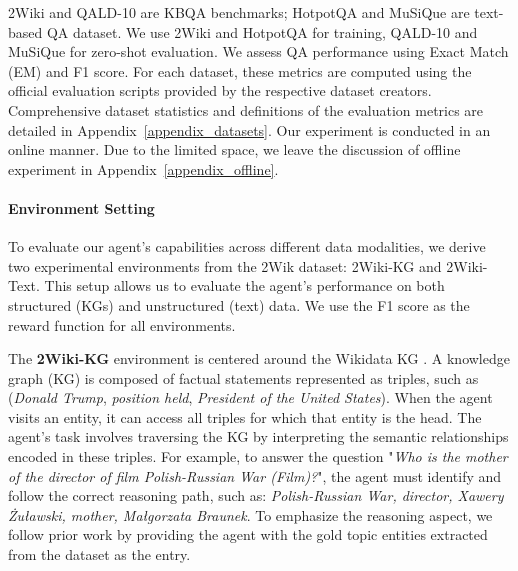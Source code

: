 2Wiki and QALD-10 are KBQA benchmarks; HotpotQA and MuSiQue are text-based QA dataset.
We use 2Wiki and HotpotQA for training, QALD-10 and MuSiQue for zero-shot evaluation.
We assess QA performance using Exact Match (EM) and F1 score.
For each dataset, these metrics are computed using the official evaluation scripts provided by the respective dataset creators.
Comprehensive dataset statistics and definitions of the evaluation metrics are detailed in Appendix~\ref{appendix_datasets}.
Our experiment is conducted in an online manner.
Due to the limited space, we leave the discussion of offline experiment in Appendix~\ref{appendix_offline}.

\vspace{-1em}
\paragraph{Environment Setting}
To evaluate our agent's capabilities across different data modalities, we derive two experimental environments from the 2Wik dataset: 2Wiki-KG and 2Wiki-Text.
This setup allows us to evaluate the agent's performance on both structured (KGs) and unstructured (text) data.
We use the F1 score as the reward function for all environments.

The \textbf{2Wiki-KG} environment is centered around the Wikidata KG \citep{Wikidata}.
A knowledge graph (KG) is composed of factual statements represented as triples, such as (\textit{Donald Trump}, \textit{position held}, \textit{President of the United States}).
When the agent visits an entity, it can access all triples for which that entity is the head.
The agent's task involves traversing the KG by interpreting the semantic relationships encoded in these triples.
For example, to answer the question "\textit{Who is the mother of the director of film Polish-Russian War (Film)?}", the agent must identify and follow the correct reasoning path, such as: \textit{Polish-Russian War, director, Xawery Żuławski, mother, Małgorzata Braunek}.
To emphasize the reasoning aspect, we follow prior work \citep{ToG, ToG2} by providing the agent with the gold topic entities extracted from the dataset as the entry.







